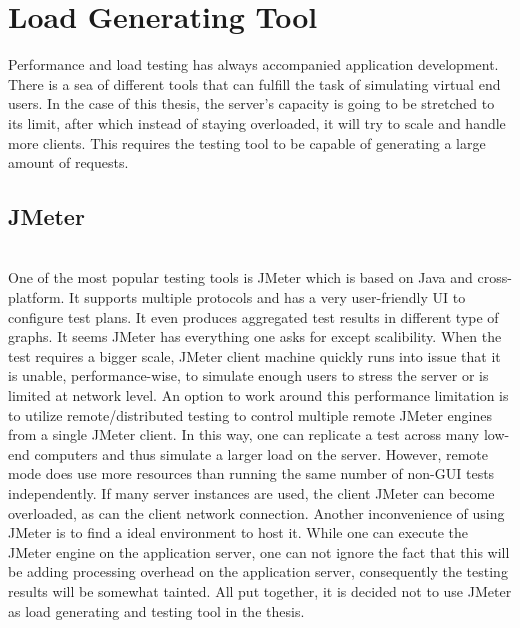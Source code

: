 \chapter{Load Generating Tool}
Performance and load testing has always accompanied application development. There is a sea of different tools that can fulfill the task of simulating virtual end users. In the case of this thesis, the server's capacity is going to be stretched to its limit, after which instead of staying overloaded, it will try to scale and handle more clients. This requires the testing tool to be capable of generating a large amount of requests. 

\section{JMeter}
\\One of the most popular testing tools is JMeter which is based on Java and cross-platform. It supports multiple protocols and has a very user-friendly UI to configure test plans. It even produces aggregated test results in different type of graphs. It seems JMeter has everything one asks for except scalibility. When the test requires a bigger scale, JMeter client machine quickly runs into issue that it is unable, performance-wise, to simulate enough users to stress the server or is limited at network level. An option to work around this performance limitation is to utilize remote/distributed testing \citep{JMeterRemote} to control multiple remote JMeter engines from a single JMeter client. In this way, one can replicate a test across many low-end computers and thus simulate a larger load on the server. However, remote mode does use more resources than running the same number of non-GUI tests independently. If many server instances are used, the client JMeter can become overloaded, as can the client network connection. Another inconvenience of using JMeter is to find a ideal environment to host it. While one can execute the JMeter engine on the application server, one can not ignore the fact that this will be adding processing overhead on the application server, consequently  the testing results will be somewhat tainted. All put together, it is decided not to use JMeter as load generating and testing tool in the thesis. \\

